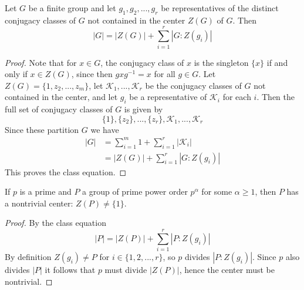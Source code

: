 \documentclass[12pt, a4paper, oneside, openright, titlepage]{book}
\begin{document}
\begin{namthm}
    Let $G$ be a finite group and let $g_1,g_2,...,g_r$ be representatives of the distinct conjugacy classes of $G$ not contained in the center $Z(G)$ of $G$. Then \begin{equation*}
        |G| = |Z(G)| + \sum\limits_{i=1}^r|G:Z(g_i)|
    \end{equation*}
\end{namthm}
\begin{proof}
    Note that for $x \in G$, the conjugacy class of $x$ is the singleton $\{x\}$ if and only if $x \in Z(G)$, since then $gxg^{-1} = x$ for all $g \in G$. Let $Z(G) = \{1,z_2,...,z_m\}$, let $\mathcal{K}_1,...,\mathcal{K}_r$ be the conjugacy classes of $G$ not contained in the center, and let $g_i$ be a representative of $\mathcal{K}_i$ for each $i$. Then the full set of conjugacy classes of $G$ is given by \begin{equation*}
        \{1\},\{z_2\},...,\{z_r\},\mathcal{K}_1,...,\mathcal{K}_r
    \end{equation*}
    Since these partition $G$ we have \begin{align*} 
        |G| &= \sum\limits_{i=1}^m1 + \sum\limits_{i=1}^r|\mathcal{K}_i| \\
        &= |Z(G)| + \sum\limits_{i=1}^r|G:Z(g_i)|
    \end{align*}
    This proves the class equation.
\end{proof}

\begin{thm}
    If $p$ is a prime and $P$ a group of prime power order $p^{\alpha}$ for some $\alpha \geq 1$, then $P$ has a nontrivial center: $Z(P) \neq \{1\}$.
\end{thm}
\begin{proof}
    By the class equation \begin{equation*}
        |P| = |Z(P)| + \sum\limits_{i=1}^r|P:Z(g_i)|
    \end{equation*}
    By definition $Z(g_i) \neq P$ for $i \in \{1,2,...,r\}$, so $p$ divides $|P:Z(g_i)|$. Since $p$ also divides $|P|$ it follows that $p$ must divide $|Z(P)|$, hence the center must be nontrivial.
\end{proof}
\end{document}
